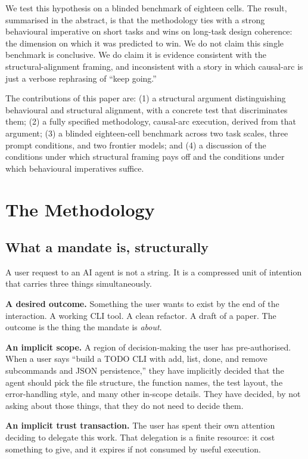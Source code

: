 \documentclass[11pt]{article}
\begin{document}
We test this hypothesis on a blinded benchmark of eighteen cells. The
result, summarised in the abstract, is that the methodology ties with a
strong behavioural imperative on short tasks and wins on long-task design
coherence: the dimension on which it was predicted to win. We do not claim
this single benchmark is conclusive. We do claim it is evidence consistent
with the structural-alignment framing, and inconsistent with a story in
which causal-arc is just a verbose rephrasing of ``keep going.''

The contributions of this paper are: (1) a structural argument
distinguishing behavioural and structural alignment, with a concrete test
that discriminates them; (2) a fully specified methodology, causal-arc
execution, derived from that argument; (3) a blinded eighteen-cell benchmark
across two task scales, three prompt conditions, and two frontier models;
and (4) a discussion of the conditions under which structural framing pays
off and the conditions under which behavioural imperatives suffice.

\section{The Methodology}
\label{sec:methodology}

\subsection{What a mandate is, structurally}

A user request to an AI agent is not a string. It is a compressed unit of
intention that carries three things simultaneously.

\textbf{A desired outcome.} Something the user wants to exist by the end of
the interaction. A working CLI tool. A clean refactor. A draft of a paper.
The outcome is the thing the mandate is \emph{about}.

\textbf{An implicit scope.} A region of decision-making the user has
pre-authorised. When a user says ``build a TODO CLI with add, list, done,
and remove subcommands and JSON persistence,'' they have implicitly
decided that the agent should pick the file structure, the function
names, the test layout, the error-handling style, and many other in-scope
details. They have decided, by not asking about those things, that they do
not need to decide them.

\textbf{An implicit trust transaction.} The user has spent their own
attention deciding to delegate this work. That delegation is a finite
resource: it cost something to give, and it expires if not consumed by
useful execution.
\end{document}
